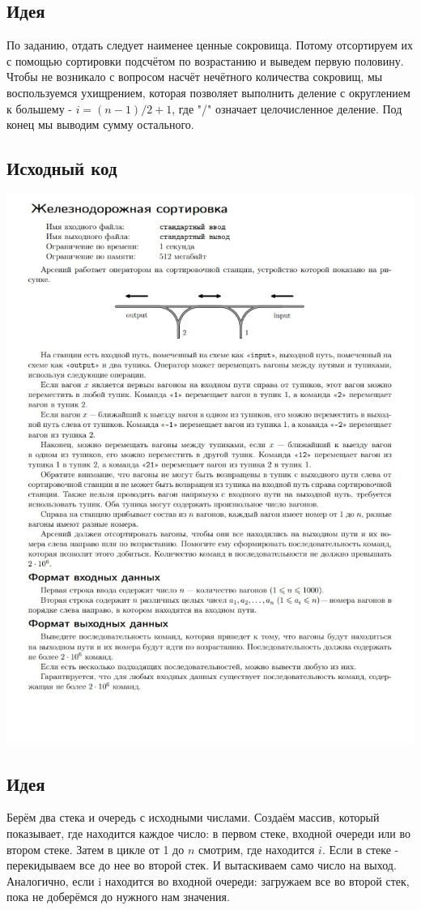 \subsection*{Идея}
По заданию, отдать следует наименее ценные сокровища. Потому отсортируем их с помощью сортировки подсчётом по возрастанию и выведем первую половину. Чтобы не возникало с вопросом насчёт нечётного количества сокровищ, мы воспользуемся ухищрением, которая позволяет выполнить деление с округлением к большему - $i = (n-1)/2+1$, где "/" означает целочисленное деление. Под конец мы выводим сумму остального.
\subsection*{Исходный код}

\includegraphics[scale=0.7]{statements/2703_K.jpg}\newline\noindent
\subsection*{Идея}
Берём два стека и очередь с исходными числами. Создаём массив, который показывает, где находится каждое число: в первом стеке, входной очереди или во втором стеке. Затем в цикле от 1 до $n$ смотрим, где находится $i$. Если в стеке - перекидываем все до нее во второй стек. И вытаскиваем само число на выход. Аналогично, если i находится во входной очереди: загружаем все во второй стек, пока не доберёмся до нужного нам значения.
